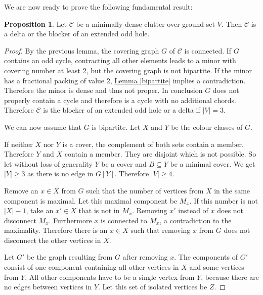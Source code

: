 \documentclass[a4paper, 12pt]{scrbook}
\theoremstyle{definition}
\newtheorem{proposition}[theorem]{Proposition}
\begin{document}
   We are now ready to prove the following fundamental result:

   \begin{proposition}\label{mindense}
       Let $\mathcal{C}$ be a minimally dense clutter over ground set $V$.
       Then $\mathcal{C}$ is a delta or the blocker of an extended odd hole.
   \end{proposition}

   \begin{proof}
       By the previous lemma, the covering graph $G$ of $\mathcal{C}$ is connected.
       If $G$ contains an odd cycle, contracting all other elements leads to a minor with covering number at least 2, but the covering graph is not bipartite.
       If the minor has a fractional packing of value 2, \hyperref[bipartite]{Lemma \ref*{bipartite}} implies a contradiction. Therefore the minor is dense and thus not proper.
       In conclusion $G$ does not properly contain a cycle and therefore is a cycle with no additional chords.
       Therefore $\mathcal{C}$ is the blocker of an extended odd hole or a delta if $|V|=3$.

       We can now assume that $G$ is bipartite.
       Let $X$ and $Y$ be the colour classes of $G$.

       If neither $X$ nor $Y$ is a cover, the complement of both sets contain a member. Therefore $Y$ and $X$ contain a member. They are disjoint which is not possible.
       So let without loss of generality $Y$ be a cover and $B \subseteq Y$ be a minimal cover.
       We get $|Y|\geq 3$ as there is no edge in $G[Y]$.
       Therefore $|V|\geq 4$.

       Remove an $x \in X$ from $G$ such that the number of vertices from $X$ in the same component is maximal.
       Let this maximal component be $M_x$.
       If this number is not $|X|-1$, take an $x' \in X$ that is not in $M_x$.
       Removing $x'$ instead of $x$ does not disconnect $M_x$. Furthermore $x$ is connected to $M_x$, a contradiction to the maximality.
       Therefore there is an $x \in X$ such that removing $x$ from $G$ does not disconnect the other vertices in $X$.

       Let $G'$ be the graph resulting from $G$ after removing $x$.
       The components of $G'$ consist of one component containing all other vertices in $X$ and some vertices from $Y$.
       All other components have to be a single vertex from $Y$, because there are no edges between vertices in $Y$.
       Let this set of isolated vertices be $Z$.


\end{proof}
\end{document}
